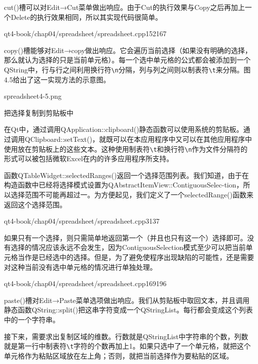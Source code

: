 \documentclass[11pt,oneside]{book}
\begin{document}
\begin{common-format}
cut()槽可以对Edit→Cut菜单做出响应。由于Cut的执行效果与Copy之后再加上一个Delete的执行效果相同，所以其实现代码很简单。 

\begin{cppline}{qt4-book/chap04/spreadsheet/spreadsheet.cpp}{152}{167}
\end{cppline}

copy()槽能够对Edit→copy做出响应。它会遍历当前选择（如果没有明确的选择，那么就认为选择的只是当前单元格）。每一个选中单元格的公式都会被添加到一个QString中，行与行之间利用换行符\verb+\n+分隔，列与列之间则以制表符\verb+\t+来分隔。图4.5给出了这一实现方法的示意图。

\begin{fig}[0.8]{spreadsheet4-5.png}
\caption{把选择复制到剪贴板中}
\label{fig:spreadsheet4-5.png}
\end{fig}

在Qt中，通过调用QApplication::clipboard()静态函数可以使用系统的剪贴板。通过调用QClipboard::setText()，就既可以在本应用程序中又可以在其他应用程序中使用放在剪贴板上的这些文本。这种使用制表符\verb+\t+和换行符\verb+\n+作为文件分隔符的形式可以被包括微软Excel在内的许多应用程序所支持。  

函数QTableWidget::selectedRanges()返回一个选择范围列表。我们知道，由于在构造函数中已经将选择模式设置为QAbstractItemView::ContiguousSelec-tion，所以选择范围不可能再超过一。为方便起见，我们定义了一个selectedRange()函数来返回这个选择范围。

\begin{cppline}{qt4-book/chap04/spreadsheet/spreadsheet.cpp}{31}{37}
\end{cppline}

如果只有一个选择，则只需简单地返回第一个（并且也只有这一个）选择即可。没有选择的情况应该永远不会发生，因为ContiguousSelection模式至少可以把当前单元格当作是已经选中的选择。但是，为了避免使程序出现缺陷的可能性，还是需要对这种当前没有选中单元格的情况进行单独处理。

\begin{cppline}{qt4-book/chap04/spreadsheet/spreadsheet.cpp}{169}{196}
\end{cppline}

paste()槽对Edit→Paste菜单选项做出响应。我们从剪贴板中取回文本，并且调用静态函数QString::split()把这串字符变成一个QStringList。每行都会变成这个列表中的一个字符串。

接下来，需要求出复制区域的维数。行数就是QStringList中字符串的个数，列数就是第一行中制表符\verb+\t+字符的个数再加上1。如果只选中了一个单元格，就把这个单元格作为粘贴区域放在左上角；否则，就把当前选择作为要粘贴的区域。


\end{common-format}
\end{document}
